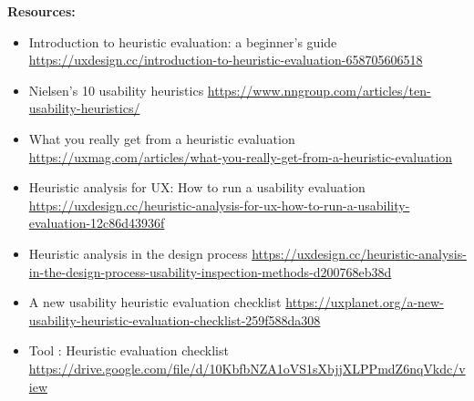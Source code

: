 \textbf{Resources:}

\begin{itemize}
\item Introduction to heuristic evaluation: a beginner's guide \url{https://uxdesign.cc/introduction-to-heuristic-evaluation-658705606518}
\item Nielsen's 10 usability heuristics \url{https://www.nngroup.com/articles/ten-usability-heuristics/}
\item What you really get from a heuristic evaluation \url{https://uxmag.com/articles/what-you-really-get-from-a-heuristic-evaluation}
\item Heuristic analysis for UX: How to run a usability evaluation \url{https://uxdesign.cc/heuristic-analysis-for-ux-how-to-run-a-usability-evaluation-12c86d43936f}
\item Heuristic analysis in the design process \url{https://uxdesign.cc/heuristic-analysis-in-the-design-process-usability-inspection-methods-d200768eb38d}
\item A new usability heuristic evaluation checklist \url{https://uxplanet.org/a-new-usability-heuristic-evaluation-checklist-259f588da308}
\item Tool : Heuristic evaluation checklist \url{https://drive.google.com/file/d/10KbfbNZA1oVS1sXbjjXLPPmdZ6nqVkdc/view}
\end{itemize}

